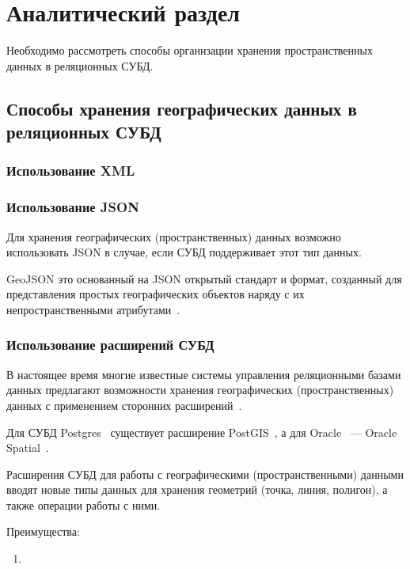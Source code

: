 \chapter{Аналитический раздел}

Необходимо рассмотреть способы организации хранения пространственных данных в реляционных СУБД.

\section{Способы хранения географических данных в реляционных СУБД}

\subsection{Использование XML}


\subsection{Использование JSON}

Для хранения географических (пространственных) данных возможно использовать JSON в случае, если СУБД поддерживает этот тип данных.

GeoJSON это основанный на JSON открытый стандарт и формат, созданный для представления простых географических объектов наряду с их непространственными атрибутами~\cite{geojson}.


\subsection{Использование расширений СУБД}

В настоящее время многие известные системы управления реляционными базами данных предлагают возможности хранения географических (пространственных) данных с применением сторонних расширений~\cite{rdbms-spatial-extensions}.

Для СУБД Postgres~\cite{pg-docs} существует расширение PostGIS~\cite{postgis-docs}, а для Oracle~\cite{oracle-docs} --- Oracle Spatial~\cite{oracle-spatial-docs}.

Расширения СУБД для работы с географическими (пространственными) данными вводят новые типы данных для хранения геометрий (точка, линия, полигон), а также операции работы с ними.

Преимущества:
\begin{enumerate}
    \item 
\end{enumerate}

